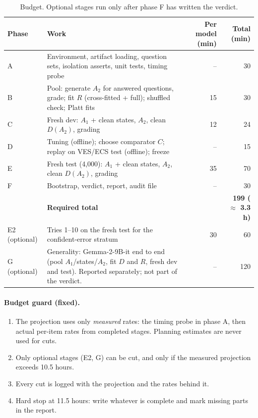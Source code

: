 \documentclass[11pt]{article}
\begin{document}
\begin{table}[H]
\centering
\small
\begin{tabularx}{\textwidth}{@{}lLrr@{}}
\toprule
Phase & Work & Per model (min) & Total (min) \\
\midrule
A & Environment, artifact loading, question sets, isolation asserts, unit tests, timing probe & -- & 30 \\
B & Pool: generate $A_2$ for answered questions, grade; fit $R$ (cross-fitted + full); shuffled check; Platt
    fits & 15 & 30 \\
C & Fresh dev: $A_1$ + clean states, $A_2$, clean $D(A_2)$, grading & 12 & 24 \\
D & Tuning (offline); choose comparator $C$; replay on VES/ECS test (offline); freeze & -- & 15 \\
E & Fresh test (4,000): $A_1$ + clean states, $A_2$, clean $D(A_2)$, grading & 35 & 70 \\
F & Bootstrap, verdict, report, audit file & -- & 30 \\
\midrule
 & \textbf{Required total} & & \textbf{199 ($\approx$ 3.3 h)} \\
\midrule
E2 (optional) & Tries 1--10 on the fresh test for the confident-error stratum & 30 & 60 \\
G (optional) & Generality: Gemma-2-9B-it end to end (pool $A_1$/states/$A_2$, fit $D$ and $R$, fresh dev and
               test). Reported separately; not part of the verdict. & -- & 120 \\
\bottomrule
\end{tabularx}
\caption{Budget. Optional stages run only after phase F has written the verdict.}
\end{table}

\paragraph{Budget guard (fixed).}
\begin{enumerate}
  \item The projection uses only \emph{measured} rates: the timing probe in phase A, then actual per-item rates
        from completed stages. Planning estimates are never used for cuts.
  \item Only optional stages (E2, G) can be cut, and only if the measured projection exceeds 10.5 hours.
  \item Every cut is logged with the projection and the rates behind it.
  \item Hard stop at 11.5 hours: write whatever is complete and mark missing parts in the report.
\end{enumerate}
\end{document}
